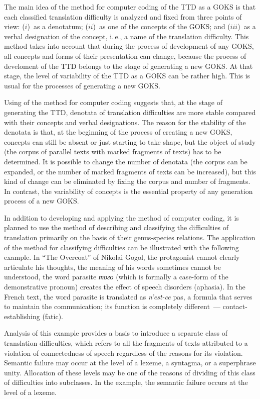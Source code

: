 \begin{multicols}{2}
   The main idea of the method for computer coding of the TTD as a GOKS is that each 
classified translation difficulty is analyzed and fixed from three points of view: ($i$)~as a denotatum; 
($ii$)~as one of the concepts of the GOKS; and ($iii$)~as a verbal designation of the concept, i.\,e., a name 
of the translation difficulty. This method takes into account that during the process of 
development of any GOKS, all concepts and forms of their presentation can change, because the 
process of develoment of the TTD belongs to the stage of generating a new GOKS. At that stage, 
the level of variability of the TTD as a GOKS can be rather high. This is usual for the processes 
of generating a new GOKS.
   
   Using of the method for computer coding suggests that, at the stage of generating the TTD, 
denotata of translation difficulties are more stable compared with their concepts and verbal 
designations. The reason for the stability of the denotata is that, at the beginning of the process of 
creating a new GOKS, concepts can still be absent or just starting to take shape, but the object of 
study (the corpus of parallel texts with marked fragments of texts) has to be determined. It is 
possible to change the number of denotata (the corpus can be expanded, or the number of marked 
fragments of texts can be increased), but this kind of change can be eliminated by fixing the 
corpus and number of fragments. In contrast, the variability of concepts is the essential property 
of any generation process of a new GOKS.
   
   In addition to developing and applying the method of computer coding, it is planned to use 
the method of describing and classifying the difficulties of translation primarily on the basis of 
their genus-species relations. The application of the method for classifying difficulties can be illustrated with the 
following example. In ``The Overcoat'' of Nikolai Gogol, the protagonist cannot clearly 
articulate his thoughts, the meaning of his words sometimes cannot be understood, the word 
parasite \textit{того} (which is formally a case-form of the demonstrative pronoun) creates the 
effect of speech disorders (aphasia). In the French text, the word parasite is translated as \textit{n'est-ce} 
pas, a formula that serves to maintain the communication; its function is completely different~--- 
contact-establishing (fatic).
   
   Analysis of this example provides a basis to introduce a separate class of translation 
difficulties, which refers to all the fragments of texts attributed to a violation of connectedness of 
speech regardless of the reasons for its violation. Semantic failure may occur at the level of a 
lexeme, a syntagma, or a superphrase unity. Allocation of these levels may be one of the reasons 
of dividing of this class of difficulties into subclasses. In the example, the semantic failure occurs 
at the level of a lexeme.
   

\end{multicols}
